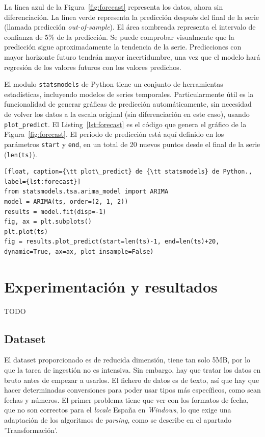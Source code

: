 \documentclass[11pt,spanish,listoffigures,listoftables]{tfgetsinf}
\begin{document}
    La línea azul de la Figura~\ref{fig:forecast} representa los datos, ahora sin diferenciación. La línea verde representa la predicción después del final de la serie (llamada predicción {\em out-of-sample}). El área sombreada representa el intervalo de confianza de 5\% de la predicción. Se puede comprobar visualmente que la predicción sigue aproximadamente la tendencia de la serie. Predicciones con mayor horizonte futuro tendrán mayor incertidumbre, una vez que el modelo hará regresión de los valores futuros con los valores predichos.

    El modulo {\tt statsmodels} de Python tiene un conjunto de herramientas estadísticas, incluyendo modelos de series temporales. Particularmente útil es la funcionalidad de generar gráficas de predicción automáticamente, sin necesidad de volver los datos a la escala original (sin diferenciación en este caso), usando {\tt plot\_predict}. El Listing~\ref{lst:forecast} es el código que genera el gráfico de la Figura~\ref{fig:forecast}. El periodo de predicción está aquí definido en los parámetros {\tt start} y {\tt end}, en un total de 20 nuevos puntos desde el final de la serie ({\tt len(ts)}).

    \lstset{style=python}
    \begin{lstlisting}[float, caption={\tt plot\_predict} de {\tt statsmodels} de Python., label={lst:forecast}]
from statsmodels.tsa.arima_model import ARIMA
model = ARIMA(ts, order=(2, 1, 2))
results = model.fit(disp=-1)
fig, ax = plt.subplots()
plt.plot(ts)
fig = results.plot_predict(start=len(ts)-1, end=len(ts)+20, dynamic=True, ax=ax, plot_insample=False)
    \end{lstlisting}


\chapter{Experimentación y resultados}
TODO

    \section{Dataset}
    El dataset proporcionado es de reducida dimensión, tiene tan solo 5MB, por lo que la tarea de ingestión no es intensiva. Sin embargo, hay que tratar los datos en bruto antes de empezar a usarlos. El fichero de datos es de texto, así que hay que hacer determinadas conversiones para poder usar tipos más específicos, como sean fechas y números. El primer problema tiene que ver con los formatos de fecha, que no son correctos para el {\em locale} España en {\em Windows}, lo que exige una adaptación de los algoritmos de {\em parsing}, como se describe en el apartado 'Transformación'.
    
\end{document}
